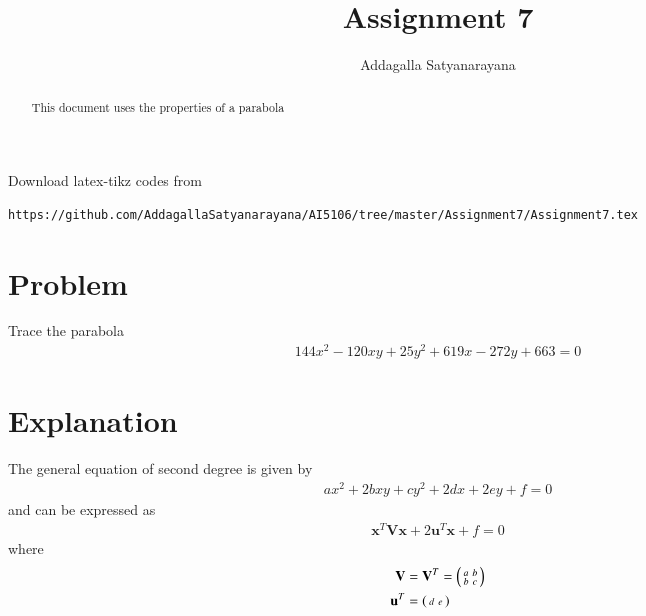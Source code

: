 \documentclass[journal,12pt,twocolumn]{IEEEtran}
\begin{document}
	\makeatother
	\let\StandardTheFigure\thefigure
	\let\vec\mathbf
	\renewcommand{\thefigure}{\theproblem}
	\def\putbox#1#2#3{\makebox[0in][l]{\makebox[#1][l]{}\raisebox{\baselineskip}[0in][0in]{\raisebox{#2}[0in][0in]{#3}}}}
	\def\rightbox#1{\makebox[0in][r]{#1}}
	\def\centbox#1{\makebox[0in]{#1}}
	\def\topbox#1{\raisebox{-\baselineskip}[0in][0in]{#1}}
	\def\midbox#1{\raisebox{-0.5\baselineskip}[0in][0in]{#1}}
	\vspace{3cm}
	\title{Assignment 7}
	\author{Addagalla Satyanarayana}
	\maketitle
	\newpage
	\bigskip
	\renewcommand{\thefigure}{\theenumi}
	\renewcommand{\thetable}{\theenumi}
\begin{abstract}
This document uses the properties of a parabola
\end{abstract}
Download latex-tikz codes from 
%
\begin{lstlisting}
https://github.com/AddagallaSatyanarayana/AI5106/tree/master/Assignment7/Assignment7.tex
\end{lstlisting}
%
\section{Problem}
	Trace the parabola
\begin{align}
	144x^2-120xy+25y^2+619x-272y+663=0\label{eq:1}
\end{align}

\section{Explanation}
The general equation of second degree is given by
\begin{align}
	ax^2+2bxy+cy^2+2dx+2ey+f=0 \label{gen_quad_eqn}
\end{align}
and can be expressed as
\begin{align}
	\vec{x}^T\vec{V}\vec{x}+2\vec{u}^T\vec{x}+f=0 \label{conic_quad_eqn}
\end{align}
where
\begin{align}
	\vec{V} &= \vec{V}^T = \myvec{a & b \\ b & c}	\\
	\vec{u}^T &= \myvec{d & e}
\end{align}
\end{document}
